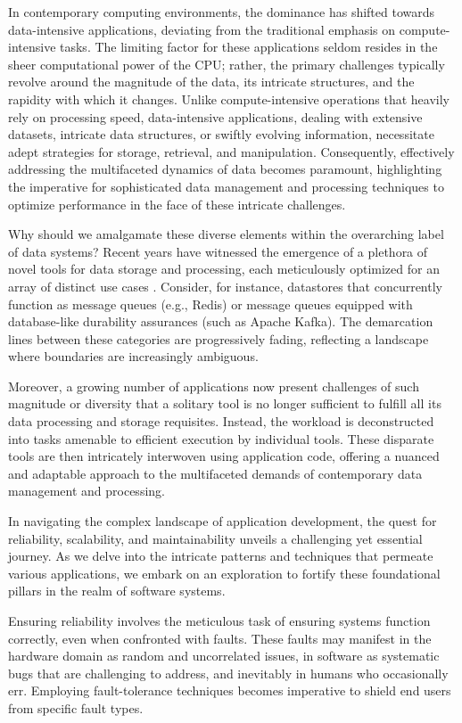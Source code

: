 
In contemporary computing environments, the dominance has shifted towards
data-intensive applications, deviating from the traditional emphasis on
compute-intensive tasks. The limiting factor for these applications seldom
resides in the sheer computational power of the CPU; rather, the primary
challenges typically revolve around the magnitude of the data, its intricate
structures, and the rapidity with which it changes. Unlike compute-intensive
operations that heavily rely on processing speed, data-intensive applications,
dealing with extensive datasets, intricate data structures, or swiftly evolving
information, necessitate adept strategies for storage, retrieval, and
manipulation. Consequently, effectively addressing the multifaceted dynamics of
data becomes paramount, highlighting the imperative for sophisticated data
management and processing techniques to optimize performance in the face of
these intricate challenges.

Why should we amalgamate these diverse elements within the overarching label of
data systems? Recent years have witnessed the emergence of a plethora of novel
tools for data storage and processing, each meticulously optimized for an array
of distinct use cases \cite{stonebraker2005onesize}. Consider, for instance,
datastores that concurrently function as message queues (e.g., Redis) or message
queues equipped with database-like durability assurances (such as Apache Kafka).
The demarcation lines between these categories are progressively fading,
reflecting a landscape where boundaries are increasingly ambiguous.

Moreover, a growing number of applications now present challenges of such
magnitude or diversity that a solitary tool is no longer sufficient to fulfill
all its data processing and storage requisites. Instead, the workload is
deconstructed into tasks amenable to efficient execution by individual tools.
These disparate tools are then intricately interwoven using application code,
offering a nuanced and adaptable approach to the multifaceted demands of
contemporary data management and processing.

In navigating the complex landscape of application development, the quest for
reliability, scalability, and maintainability unveils a challenging yet
essential journey. As we delve into the intricate patterns and techniques that
permeate various applications, we embark on an exploration to fortify these
foundational pillars in the realm of software systems.

Ensuring reliability involves the meticulous task of ensuring systems function
correctly, even when confronted with faults. These faults may manifest in the
hardware domain as random and uncorrelated issues, in software as systematic
bugs that are challenging to address, and inevitably in humans who occasionally
err. Employing fault-tolerance techniques becomes imperative to shield end users
from specific fault types.

